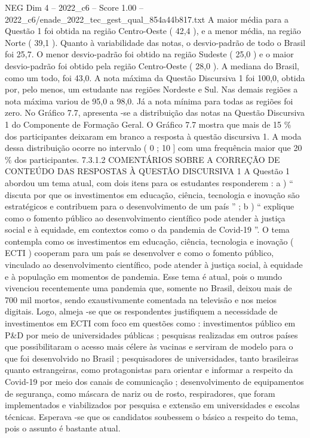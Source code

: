 \begin{textsample}{NEG Dim 4 – 2022\_c6 – Score 1.00 – 2022\_c6/enade\_2022\_tec\_gest\_qual\_854a44b817.txt}
A maior média para a Questão 1 foi obtida na região Centro-Oeste ( 42,4 ), e a menor média, na região Norte ( 39,1 ).
Quanto à variabilidade das notas, o desvio-padrão de todo o Brasil foi 25,7.
O menor desvio-padrão foi obtido na região Sudeste ( 25,0 ) e o maior desvio-padrão foi obtido pela região Centro-Oeste ( 28,0 ).
A mediana do Brasil, como um todo, foi 43,0.
A nota máxima da Questão Discursiva 1 foi 100,0, obtida por, pelo menos, um estudante nas regiões Nordeste e Sul.
Nas demais regiões a nota máxima variou de 95,0 a 98,0.
Já a nota mínima para todas as regiões foi zero.
No Gráfico 7.7, apresenta -se a distribuição das notas na Questão Discursiva 1 do Componente de Formação Geral.
O Gráfico 7.7 mostra que mais de 15 \% dos participantes deixaram em branco a resposta à questão discursiva 1.
A moda dessa distribuição ocorre no intervalo ( 0 ; 10 ] com uma frequência maior que 20 \% dos participantes. 7.3.1.2 COMENTÁRIOS SOBRE A CORREÇÃO DE CONTEÚDO DAS RESPOSTAS À QUESTÃO DISCURSIVA 1 A Questão 1 abordou um tema atual, com dois itens para os estudantes responderem : a ) “ discuta por que os investimentos em educação, ciência, tecnologia e inovação são estratégicos e contribuem para o desenvolvimento de um país ” ; b ) “ explique como o fomento público ao desenvolvimento científico pode atender à justiça social e à equidade, em contextos como o da pandemia de Covid-19 ”.
O tema contempla como os investimentos em educação, ciência, tecnologia e inovação ( ECTI ) cooperam para um país se desenvolver e como o fomento público, vinculado ao desenvolvimento científico, pode atender à justiça social, à equidade e à população em momentos de pandemia.
Esse tema é atual, pois o mundo vivenciou recentemente uma pandemia que, somente no Brasil, deixou mais de 700 mil mortos, sendo exaustivamente comentada na televisão e nos meios digitais.
Logo, almeja -se que os respondentes justifiquem a necessidade de investimentos em ECTI com foco em questões como : investimentos público em P\&D por meio de universidades públicas ; pesquisas realizadas em outros países que possibilitaram o acesso mais célere às vacinas e serviram de modelo para o que foi desenvolvido no Brasil ; pesquisadores de universidades, tanto brasileiras quanto estrangeiras, como protagonistas para orientar e informar a respeito da Covid-19 por meio dos canais de comunicação ; desenvolvimento de equipamentos de segurança, como máscara de nariz ou de rosto, respiradores, que foram implementados e viabilizados por pesquisa e extensão em universidades e escolas técnicas.
Esperava -se que os candidatos soubessem o básico a respeito do tema, pois o assunto é bastante atual.

\end{textsample}
